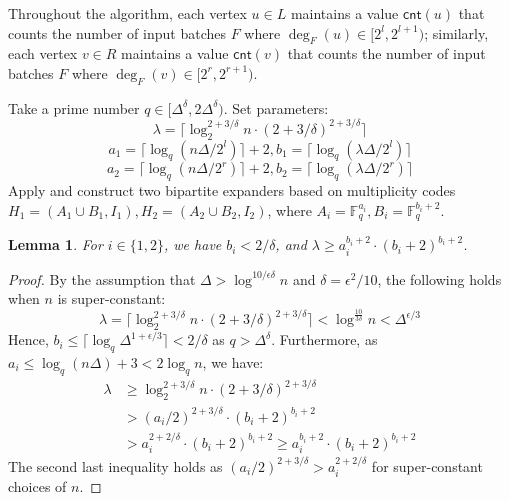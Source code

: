 \documentclass[11pt,a4paper]{article}
\newtheorem{lemma}{Lemma}[section]
\newcommand{\ceil}[1]{\lceil #1 \rceil}
\newcommand{\cnt}{\mathsf{cnt}}
\newcommand{\field}{\mathbb{F}}
\begin{document}
Throughout the algorithm, each vertex $u\in L$ maintains a value $\cnt(u)$ that counts the number of input batches $F$ where $\deg_F(u)\in [2^l, 2^{l+1})$; similarly, each vertex $v\in R$ maintains a value $\cnt(v)$ that counts the number of input batches $F$ where $\deg_F(v)\in [2^r, 2^{r+1})$. 

Take a prime number $q\in [\Delta^\delta, 2\Delta^\delta)$. Set parameters:
$$\lambda = \ceil{\log^{2+3/\delta}_2 n\cdot (2 + 3/\delta)^{2+3/\delta}}$$
$$a_1 = \ceil{\log_q (n\Delta / 2^l)}+2, b_1 = \ceil{\log_q (\lambda\Delta / 2^l)}$$
$$a_2 = \ceil{\log_q (n\Delta / 2^r)}+2, b_2 = \ceil{\log_q (\lambda\Delta / 2^r)}$$
Apply  and construct two bipartite expanders based on multiplicity codes $H_1 = (A_1\cup B_1, I_1), H_2 = (A_2\cup B_2, I_2)$, where $A_i = \field_q^{a_i}, B_i = \field_q^{b_i+2}$. 

\begin{lemma}
    For $i\in \{1,2\}$, we have $b_i< 2/\delta$, and $\lambda \geq a_i^{b_i+2}\cdot (b_i+2)^{b_i+2}$.
\end{lemma}
\begin{proof}
    By the assumption that $\Delta > \log^{10/\epsilon\delta}n$ and $\delta = \epsilon^2/10$, the following holds when $n$ is super-constant:
    $$\lambda = \ceil{\log_2^{2+3/\delta}n\cdot (2 + 3/\delta)^{2+3/\delta}} <\log^{\frac{10}{3\delta}}n< \Delta^{\epsilon/3}$$
    Hence, $b_i \leq \ceil{\log_q \Delta^{1+\epsilon/3}} < 2/\delta$ as $q > \Delta^\delta$. Furthermore, as $a_i \leq \log_q (n\Delta) + 3 < 2\log_q n$, we have:
    $$\begin{aligned}
        \lambda &\geq \log_2^{2+3/\delta}n\cdot (2+3/\delta)^{2+3/\delta}\\
        &> (a_i/2)^{2+3/\delta}\cdot (b_i+2)^{b_i+2}\\
        &> a_i^{2+2/\delta}\cdot (b_i+2)^{b_i+2} \geq a_i^{b_i+2}\cdot (b_i+2)^{b_i+2}
    \end{aligned}$$
    The second last inequality holds as $(a_i/2)^{2+3/\delta} > a_i^{2+2/\delta}$ for super-constant choices of $n$.
\end{proof}
\end{document}
